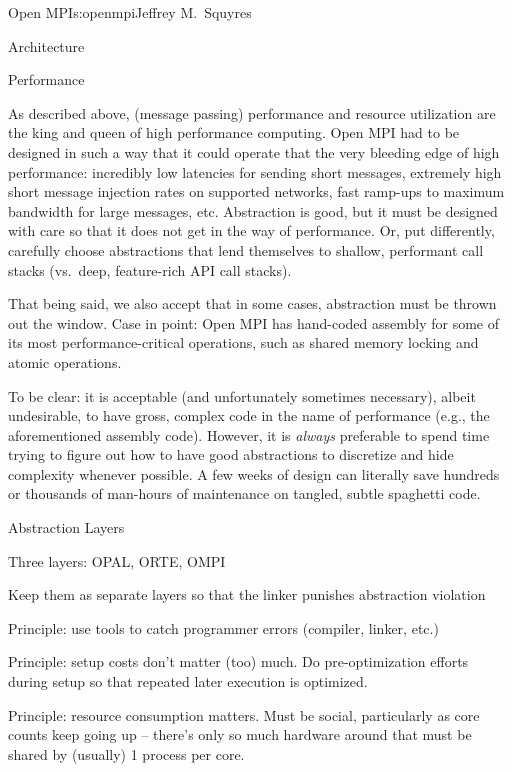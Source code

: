\begin{aosachapter}{Open MPI}{s:openmpi}{Jeffrey M.\ Squyres}
\begin{aosasect1}{Architecture}

\begin{aosasect2}{Performance}

As described above, (message passing) performance and resource
utilization are the king and queen of high performance computing.
%
Open MPI had to be designed in such a way that it could operate that
the very bleeding edge of high performance: incredibly low latencies
for sending short messages, extremely high short message injection
rates on supported networks, fast ramp-ups to maximum bandwidth for
large messages, etc.  Abstraction is good, but it must be designed
with care so that it does not get in the way of performance.  Or, put
differently, carefully choose abstractions that lend themselves to
shallow, performant call stacks (vs.\ deep, feature-rich API call
stacks).

That being said, we also accept that in some cases, abstraction must
be thrown out the window.  Case in point: Open MPI has hand-coded
assembly for some of its most performance-critical operations, such as
shared memory locking and atomic operations.

To be clear: it is acceptable (and unfortunately sometimes necessary),
albeit undesirable, to have gross, complex code in the name of
performance (e.g., the aforementioned assembly code).  However, it is
{\em always} preferable to spend time trying to figure out how to have
good abstractions to discretize and hide complexity whenever possible.
A few weeks of design can literally save hundreds or thousands of
man-hours of maintenance on tangled, subtle spaghetti code.

\end{aosasect2}


\begin{aosasect2}{Abstraction Layers}

\begin{aosaitemize}
\item Three layers: OPAL, ORTE, OMPI
  \begin{aosaitemize}
  \item Keep them as separate layers so that the linker punishes
    abstraction violation
  \item Principle: use tools to catch programmer errors (compiler,
    linker, etc.)
  \item Principle: setup costs don't matter (too) much.  Do
    pre-optimization efforts during setup so that repeated later
    execution is optimized.
  \item Principle: resource consumption matters.  Must be social,
    particularly as core counts keep going up -- there's only so much
    hardware around that must be shared by (usually) 1 process per
    core.
  \end{aosaitemize}


\end{aosaitemize}
\end{aosasect2}
\end{aosasect1}
\end{aosachapter}
